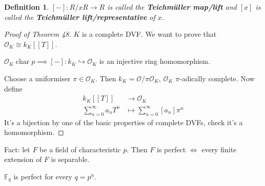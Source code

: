 \documentclass[a4paper]{article}
\newtheorem{definition}{Definition}
\DeclareMathOperator{\characteristic}{char}
\begin{document}
\begin{definition}
	$[-]:R/xR \to R$ is called the \textbf{Teichm\"uller map/lift}
	and $[x]$ is called the \textbf{Teichm\"uller lift/representative} of $x$.
\end{definition}
\begin{proof}[Proof of Theorem 48]
	$K$ is a complete DVF.
	We want to prove that $\mathcal{O}_K \cong k_K[[T]]$.
	
	$\mathcal{O}_K \characteristic p \implies [-]:k_K \hookrightarrow \mathcal{O}_K$ is an injective ring homomorphism.
	
	Choose a uniformiser $\pi \in \mathcal{O}_K$. Then
	$k_K = \mathcal{O}/\pi\mathcal{O}_K$, $\mathcal{O}_K$ $\pi$-adically complete.
	Now define
	\begin{align*}
		k_K[[T]] &\to \mathcal{O}_K \\
		\sum_{n=0}^\infty a_n T^n &\mapsto \sum_{n=0}^\infty [a_n] \pi^n
	\end{align*}
	It's a bijection by one of the basic properties of complete DVFs, check it's a homomorphism.
\end{proof}

Fact: let $F$ be a field of characteristic $p$. Then $F$ is perfect $\iff$ every finite extension of $F$ is separable.

$\mathbb{F}_q$ is perfect for every $q=p^n$.
\end{document}

